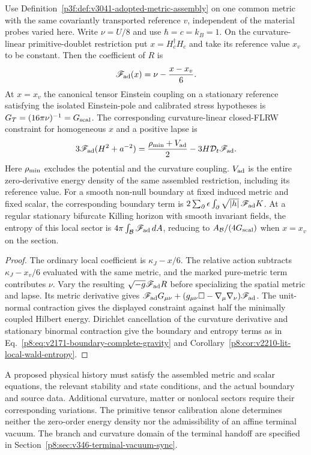 \documentclass[12pt,a4paper]{article}
\begin{document}
\begin{corollary}
\label{p8:cor:v3041-centered-einstein-readouts}
Use Definition~\ref{p3f:def:v3041-adopted-metric-assembly} on one
common metric with the same covariantly transported reference $v$,
independent of the material probes varied here. Write $\nu=U/8$ and
use $\hbar=c=k_B=1$. On the curvature-linear primitive-doublet
restriction put $x=H_c^\dagger H_c$ and take its reference value
$x_v$ to be constant. Then the coefficient of $R$ is
\[
 \mathscr F_{\rm ad}(x)=\nu-\frac{x-x_v}{6}.
\]
At $x=x_v$ the canonical tensor Einstein coupling on a stationary
reference satisfying the isolated Einstein-pole and calibrated
stress hypotheses is $G_T=(16\pi\nu)^{-1}=G_{\rm scal}$.
The corresponding curvature-linear closed-FLRW constraint for
homogeneous $x$ and a positive lapse is
\[
 3\mathscr F_{\rm ad}(H^2+a^{-2})
 =\frac{\rho_{\rm min}+V_{\rm ad}}{2}
     -3H\mathcal D_t\mathscr F_{\rm ad}.
\]
Here $\rho_{\rm min}$ excludes the potential and the curvature
coupling. $V_{\rm ad}$ is the entire zero-derivative energy density
of the same assembled restriction, including its reference value.
For a smooth non-null boundary at fixed induced metric and fixed
scalar, the corresponding boundary term is
$2\sum_{\partial}\epsilon\int_{\partial}\sqrt{|h|}\,
\mathscr F_{\rm ad}K$. At a regular stationary bifurcate Killing
horizon with smooth invariant fields, the entropy of this local
sector is $4\pi\int_{\mathcal B}\mathscr F_{\rm ad}\,dA$, reducing
to $A_{\mathcal B}/(4G_{\rm scal})$ when $x=x_v$ on the section.
\end{corollary}
\begin{proof}
The ordinary local coefficient is $\kappa_J-x/6$. The relative action
subtracts $\kappa_J-x_v/6$ evaluated with the same metric, and the
marked pure-metric term contributes $\nu$. Vary the resulting
$\sqrt{-g}\mathscr F_{\rm ad}R$ before specializing the spatial
metric and lapse. Its metric derivative gives
$\mathscr F_{\rm ad}G_{\mu\nu}
 +(g_{\mu\nu}\Box-\nabla_\mu\nabla_\nu)\mathscr F_{\rm ad}$.
The unit-normal contraction gives the displayed constraint against
half the minimally coupled Hilbert energy. Dirichlet cancellation of
the curvature derivative and stationary binormal contraction give the
boundary and entropy terms as in Eq.~\eqref{p8:eq:v2171-boundary-complete-gravity}
and Corollary~\ref{p8:cor:v2210-lit-local-wald-entropy}.
\end{proof}
A proposed physical history must satisfy the assembled metric and
scalar equations, the relevant stability and state conditions, and
the actual boundary and source data. Additional curvature, matter
or nonlocal sectors require their corresponding variations.
The primitive tensor calibration alone determines neither the
zero-order energy density nor the admissibility of an affine
terminal vacuum. The branch and curvature domain of the terminal
handoff are specified in Section~\ref{p8:sec:v346-terminal-vacuum-sync}.
\end{document}
